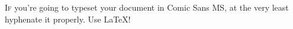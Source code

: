\documentclass[paper=a6,pagesize=pdftex]{scrbook}
\begin{document}
\pagestyle{empty}

\parbox{3.6cm}{
\lettrine{I}{f} you're going to typeset your document in Comic Sans MS,
at the very least hyphenate it properly. Use \LaTeX!
}
\end{document}
